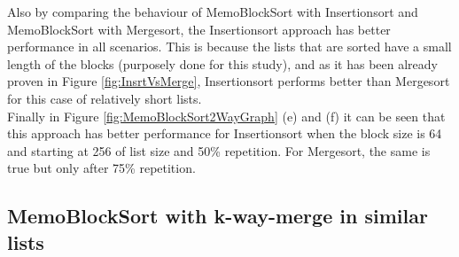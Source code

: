 \documentclass[a4paper,12pt]{article}
\begin{document}
Also by comparing the behaviour of MemoBlockSort with Insertionsort and MemoBlockSort with Mergesort, the Insertionsort approach has better performance in all scenarios. This is because the lists that are sorted have a small length of the blocks (purposely done for this study), and as it has been already proven in Figure \ref{fig:InsrtVsMerge}, Insertionsort performs better than Mergesort for this case of relatively short lists.\\


Finally in Figure \ref{fig:MemoBlockSort2WayGraph} (e) and (f)  it can be seen that this approach has better performance for Insertionsort when the block size is 64 and starting at 256 of list size and 50\% repetition. For Mergesort, the same is true but only after 75\% repetition.

\subsection{MemoBlockSort with k-way-merge in similar lists}
\end{document}

